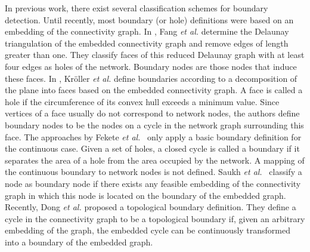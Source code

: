 \documentclass{llncs}
\begin{document}
In previous work, there exist several classification schemes for boundary detection.
Until recently, most boundary (or hole) definitions were based on an embedding of the connectivity graph.
In \cite{fgg04}, Fang \emph{et al.} determine the Delaunay triangulation of the embedded connectivity graph and remove edges of length greater than one.
They classify faces of this reduced Delaunay graph with at least four edges as holes of the network.
Boundary nodes are those nodes that induce these faces.
In \cite{kfpf-dbrte-06}, Kr\"oller \emph{et al.} define boundaries according to a decomposition of the plane into faces based on the embedded connectivity graph.
A face is called a hole if the circumference of its convex hull exceeds a minimum value.
Since vertices of a face usually do not correspond to network nodes, the authors define boundary nodes to be the nodes on a cycle in the network graph surrounding this face.
The approaches by Fekete \emph{et al.}~\cite{fkkl-brgsn-05,fkpfb04} only apply a basic boundary definition for the continuous case.
Given a set of holes, a closed cycle is called a boundary if it separates the area of a hole from the area occupied by the network.
A mapping of the continuous boundary to network nodes is not defined.
Saukh \emph{et al.}~\cite{saukh10} classify a node as boundary node if there exists any feasible embedding of the connectivity graph in which this node is located on the boundary of the embedded graph.
Recently, Dong \emph{et al.} \cite{dll09} proposed a topological boundary definition.
They define a cycle in the connectivity graph to be a topological boundary if, given an arbitrary embedding of the graph, the embedded cycle can be continuously transformed into a boundary of the embedded graph.
\end{document}
